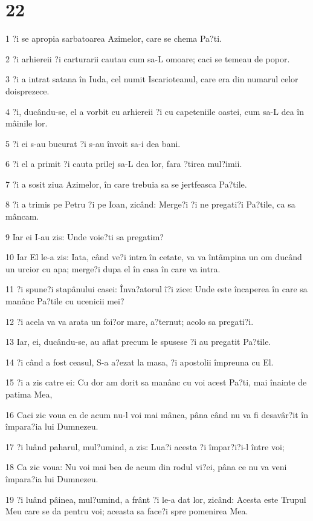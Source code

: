 \chapter{22}

\par 1 ?i se apropia sarbatoarea Azimelor, care se chema Pa?ti.
\par 2 ?i arhiereii ?i carturarii cautau cum sa-L omoare; caci se temeau de popor.
\par 3 ?i a intrat satana în Iuda, cel numit Iscarioteanul, care era din numarul celor doisprezece.
\par 4 ?i, ducându-se, el a vorbit cu arhiereii ?i cu capeteniile oastei, cum sa-L dea în mâinile lor.
\par 5 ?i ei s-au bucurat ?i s-au învoit sa-i dea bani.
\par 6 ?i el a primit ?i cauta prilej sa-L dea lor, fara ?tirea mul?imii.
\par 7 ?i a sosit ziua Azimelor, în care trebuia sa se jertfeasca Pa?tile.
\par 8 ?i a trimis pe Petru ?i pe Ioan, zicând: Merge?i ?i ne pregati?i Pa?tile, ca sa mâncam.
\par 9 Iar ei I-au zis: Unde voie?ti sa pregatim?
\par 10 Iar El le-a zis: Iata, când ve?i intra în cetate, va va întâmpina un om ducând un urcior cu apa; merge?i dupa el în casa în care va intra.
\par 11 ?i spune?i stapânului casei: Înva?atorul î?i zice: Unde este încaperea în care sa manânc Pa?tile cu ucenicii mei?
\par 12 ?i acela va va arata un foi?or mare, a?ternut; acolo sa pregati?i.
\par 13 Iar, ei, ducându-se, au aflat precum le spusese ?i au pregatit Pa?tile.
\par 14 ?i când a fost ceasul, S-a a?ezat la masa, ?i apostolii împreuna cu El.
\par 15 ?i a zis catre ei: Cu dor am dorit sa manânc cu voi acest Pa?ti, mai înainte de patima Mea,
\par 16 Caci zic voua ca de acum nu-l voi mai mânca, pâna când nu va fi desavâr?it în împara?ia lui Dumnezeu.
\par 17 ?i luând paharul, mul?umind, a zis: Lua?i acesta ?i împar?i?i-l între voi;
\par 18 Ca zic voua: Nu voi mai bea de acum din rodul vi?ei, pâna ce nu va veni împara?ia lui Dumnezeu.
\par 19 ?i luând pâinea, mul?umind, a frânt ?i le-a dat lor, zicând: Acesta este Trupul Meu care se da pentru voi; aceasta sa face?i spre pomenirea Mea.
